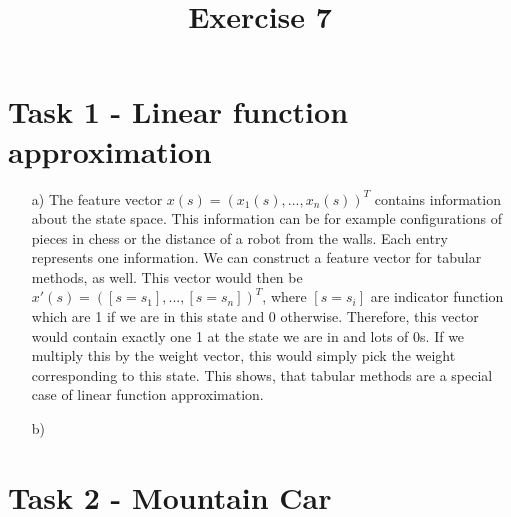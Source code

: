\documentclass[a4paper]{article}
\date{}
\author{}
\title{\textbf{Exercise 7}}
\begin{document}
\maketitle 
\thispagestyle{fancy}

\section*{Task 1 - Linear function approximation}

\begin{enumerate}
	\item[a)] The feature vector $x(s) = (x_1(s), ..., x_n(s))^T$ contains information about the state space. 
	This information can be for example configurations of pieces in chess or the distance of a robot from the walls. 
	Each entry represents one information.
	We can construct a feature vector for tabular methods, as well. 
	This vector would then be $x'(s) = ([s = s_1], ..., [s = s_n])^T$, where $[s = s_i]$ are indicator function which are 1 if we are in this state and 0 otherwise. 
	Therefore, this vector would contain exactly one 1 at the state we are in and lots of 0s. 
	If we multiply this by the weight vector, this would simply pick the weight corresponding to this state. 
	This shows, that tabular methods are a special case of linear function approximation.
	
	\item[b)] 
	
\end{enumerate}


\section*{Task 2 - Mountain Car}
\end{document}
